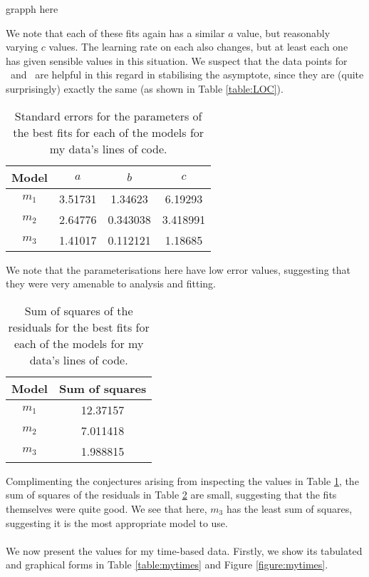 \FIXME grapph here

We note that each of these fits again has a similar $a$ value, but 
reasonably varying $c$ values.
The learning rate on each also changes, but at least each one has given sensible
values in this situation.
We suspect that the data points for \AT\ and \ATh\ are helpful in this regard in
stabilising the asymptote, since they are (quite surprisingly) exactly the same
(as shown in Table \ref{table:LOC}).

\begin{table}[ht!]
\centering
\begin{tabular}{|c|c|c|c|}
\hline
{\bf Model} &  $a$ & $b$ & $c$ \\
\hline
$m_1$ & 3.51731 & 1.34623 & 6.19293 \\
\hline
$m_2$ & 2.64776 & 0.343038 & 3.418991\\
\hline
$m_3$ & 1.41017 & 0.112121 & 1.18685 \\
\hline
\end{tabular}
\caption{Standard errors for the parameters of the best fits for each of the
  models for my data's lines of code.}
\label{table:LOC:abc:error}
\end{table}

We note that the parameterisations here have low error values, suggesting that
they were very amenable to analysis and fitting.

\begin{table}[ht!]
\centering
\begin{tabular}{|c|c|}
\hline
{\bf Model} & Sum of squares \\
\hline
$m_1$ & 12.37157\\
\hline
$m_2$ & 7.011418\\
\hline
$m_3$ & 1.988815\\
\hline
\end{tabular}
\caption{Sum of squares of the residuals for the best fits for each of the
  models for my data's lines of code.}
\label{table:LOC:abc:sumsquares}
\end{table}

Complimenting the conjectures arising from inspecting the values in Table
\ref{table:LOC:abc:error}, the sum of squares of the residuals in Table
\ref{table:LOC:abc:sumsquares} are small, suggesting that the fits themselves
were quite good.
We see that here, $m_3$ has the least sum of squares, suggesting it is the most
appropriate model to use.\\
\\
We now present the values for my time-based data.
Firstly, we show its tabulated and graphical forms in Table \ref{table:mytimes}
and Figure \ref{figure:mytimes}.

